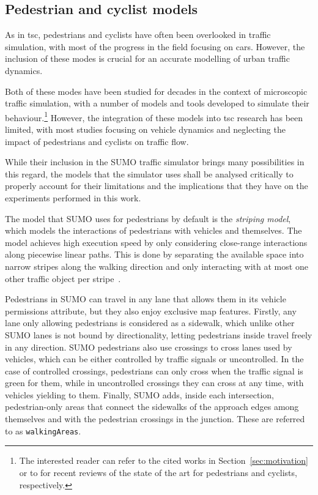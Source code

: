\subsection{Pedestrian and cyclist models}

As in \gls{tsc}, pedestrians and cyclists have often been overlooked in traffic simulation, with most of the progress in the field focusing on cars. However, the inclusion of these modes is crucial for an accurate modelling of urban traffic dynamics.

Both of these modes have been studied for decades in the context of microscopic traffic simulation, with a number of models and tools developed to simulate their behaviour.\footnote{The interested reader can refer to the cited works in Section~\ref{sec:motivation} or to \cite{Papathanasopoulou2024, Brunner2024} for recent reviews of the state of the art for pedestrians and cyclists, respectively.} However, the integration of these models into \gls{tsc} research has been limited, with most studies focusing on vehicle dynamics and neglecting the impact of pedestrians and cyclists on traffic flow. 

While their inclusion in the SUMO traffic simulator brings many possibilities in this regard, the models that the simulator uses shall be analysed critically to properly account for their limitations and the implications that they have on the experiments performed in this work.

The model that SUMO uses for pedestrians by default is the \textit{striping model}, which models the interactions of pedestrians with vehicles and themselves. The model achieves high execution speed by only considering close-range interactions along piecewise linear paths. This is done by separating the available space into narrow stripes along the walking direction and only interacting with at most one other traffic object per stripe~\cite{AlvarezLopez2018}.

Pedestrians in SUMO can travel in any lane that allows them in its vehicle permissions attribute, but they also enjoy exclusive map features. Firstly, any lane only allowing pedestrians is considered as a sidewalk, which unlike other SUMO lanes is not bound by directionality, letting pedestrians inside travel freely in any direction. SUMO pedestrians also use crossings to cross lanes used by vehicles, which can be either controlled by traffic signals or uncontrolled. In the case of controlled crossings, pedestrians can only cross when the traffic signal is green for them, while in uncontrolled crossings they can cross at any time, with vehicles yielding to them. Finally, SUMO adds, inside each intersection, pedestrian-only areas that connect the sidewalks of the approach edges among themselves and with the pedestrian crossings in the junction. These are referred to as \texttt{walkingAreas}.

